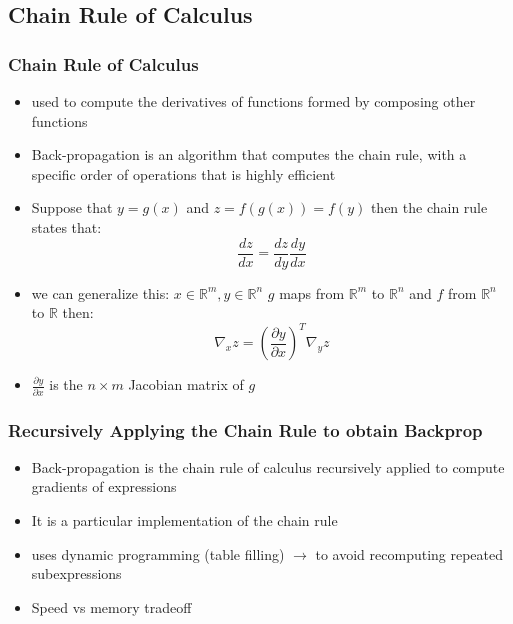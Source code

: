 \documentclass{beamer}
\begin{document}
\subsection{Chain Rule of Calculus}
\begin{frame}
	\frametitle{Chain Rule of Calculus}
\begin{itemize}
	\item used to compute the derivatives of functions formed by composing other functions
	\item Back-propagation is an algorithm that computes the chain rule, with a speciﬁc order of operations that is highly eﬃcient
	\item Suppose that $y = g(x)$ and $z= f(g(x)) = f(y)$ then the chain rule states that: 
		$$ \frac{dz}{dx} = \frac{dz}{dy} \frac{dy}{dx}$$
	\item we can generalize this: $ x \in \mathbb{R}^m , y \in \mathbb{R}^n$ $g$ maps from $\mathbb{R}^m$ to $\mathbb{R}^n$ and $f$ from $\mathbb{R}^n$ to $\mathbb{R}$ then: 
		$$\nabla_{x}z = (\frac{\partial y}{\partial x})^T \nabla_{y}z $$
	\item $\frac{\partial y}{\partial x}$ is the $n \times m$ Jacobian matrix of $g$
\end{itemize}	
\end{frame}
\begin{frame}
	\frametitle{Recursively Applying the Chain Rule to obtain Backprop}
	\begin{itemize}
		\item Back-propagation is the chain rule of calculus recursively applied to compute gradients of expressions 
		\item It is a particular implementation of the chain rule
		\item uses dynamic programming (table filling) $\rightarrow$ to avoid recomputing repeated subexpressions
		\item Speed vs memory tradeoff
		
	\end{itemize}	
\end{frame}
\end{document}
